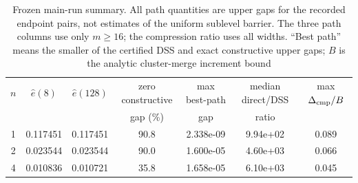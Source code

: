 \begin{table}[t]
\caption{Frozen main-run summary. All path quantities are upper gaps for the recorded endpoint pairs, not estimates of the uniform sublevel barrier. The three path columns use only $m\ge16$; the compression ratio uses all widths. ``Best path'' means the smaller of the certified DSS and exact constructive upper gaps; $B$ is the analytic cluster-merge increment bound}
\label{tab:main-computation}
\centering
\scriptsize
\setlength{\tabcolsep}{3pt}
\begin{tabular}{@{}ccccccc@{}}
\toprule
$n$ & $\widehat e(8)$ & $\widehat e(128)$ & zero constructive & max best-path & median direct/DSS & max $\Delta_{\rm cmp}/B$ \\
 & & & gap (\%) & gap & ratio & \\
\midrule
1 & 0.117451 & 0.117451 & 90.8 & 2.338e-09 & 9.94e+02 & 0.089 \\
2 & 0.023544 & 0.023544 & 90.0 & 1.600e-05 & 4.60e+03 & 0.066 \\
4 & 0.010836 & 0.010721 & 35.8 & 1.658e-05 & 6.10e+03 & 0.045 \\
\bottomrule
\end{tabular}
\end{table}
